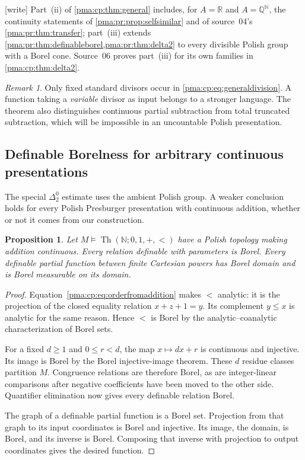 \documentclass[11pt]{article}
\numberwithin{equation}{section}
\newtheorem{proposition}[proposition]{Proposition}
\theoremstyle{definition}
\theoremstyle{remark}
\newtheorem{remark}[remark]{Remark}
\newcommand{\N}{\mathbb N}
\newcommand{\Q}{\mathbb Q}
\newcommand{\R}{\mathbb R}
\newcommand{\Th}{\operatorname{Th}}
\newcommand{\writetag}{\textup{\textsf{\small[write]}}}
\begin{document}
\noindent\writetag{} Part~(ii) of \cref{pma:cp:thm:general} includes, for
$A=\R$ and $A=\Q^{\N}$, the continuity statements of
\cref{pma:pr:prop:selfsimilar} and of source~04's \cref{pma:pr:thm:transfer};
part~(iii) extends \cref{pma:pr:thm:definableborel,pma:pr:thm:delta2} to every
divisible Polish group with a Borel cone. Source~06 proves part~(iii) for its
own families in \cref{pma:cp:thm:delta2}.

\begin{remark}
Only fixed standard divisors occur in \eqref{pma:cp:eq:generaldivision}. A function
taking a \emph{variable} divisor as input belongs to a stronger language.
The theorem also distinguishes continuous partial subtraction from total
truncated subtraction, which will be impossible in an uncountable Polish
presentation.
\end{remark}

\subsection{Definable Borelness for arbitrary continuous presentations}

The special $\Delta^0_2$ estimate uses the ambient Polish group. A weaker
conclusion holds for every Polish Presburger presentation with continuous
addition, whether or not it comes from our construction.

\begin{proposition}
\label{pma:cp:prop:allborel}
Let $M\models\Th(\N;0,1,+,<)$ have a Polish topology making addition continuous.
Every relation definable with parameters is Borel. Every definable partial
function between finite Cartesian powers has Borel domain and is Borel
measurable on its domain.
\end{proposition}

\begin{proof}
Equation~\eqref{pma:cp:eq:orderfromaddition} makes $<$ analytic: it is the
projection of the closed equality relation $x+z+1=y$. Its complement
$y\leq x$ is analytic for the same reason. Hence $<$ is Borel by the
analytic--coanalytic characterization of Borel sets.

For a fixed $d\geq1$ and $0\leq r<d$, the map $x\mapsto dx+r$ is
continuous and injective. Its image is Borel by the Borel injective-image
theorem. These $d$ residue classes partition $M$. Congruence relations are
therefore Borel, as are integer-linear comparisons after negative
coefficients have been moved to the other side. Quantifier elimination
now gives every definable relation Borel.

The graph of a definable partial function is a Borel set. Projection from
that graph to its input coordinates is Borel and injective. Its image,
the domain, is Borel, and its inverse is Borel. Composing that inverse
with projection to output coordinates gives the desired function.
\end{proof}
\end{document}
